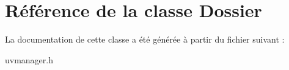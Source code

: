 \hypertarget{class_dossier}{\section{Référence de la classe Dossier}
\label{class_dossier}
}


La documentation de cette classe a été générée à partir du fichier suivant \+:\begin{DoxyCompactItemize}
\item 
uvmanager.\+h\end{DoxyCompactItemize}
